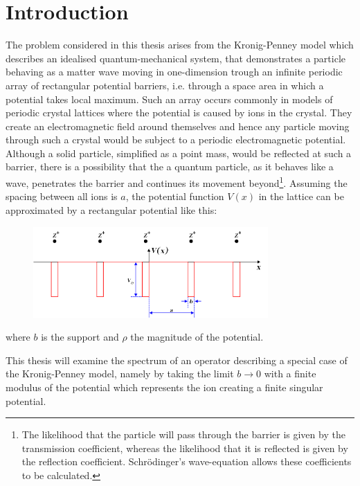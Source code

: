 \chapter{Introduction}

The problem considered in this thesis arises from the Kronig-Penney model which describes an idealised quantum-mechanical system, that demonstrates a particle behaving as a matter wave moving in one-dimension trough an infinite periodic array of rectangular potential barriers, i.e. through a space area in which a potential takes local maximum. Such an array occurs commonly in models of periodic crystal lattices where the potential is caused by ions in the crystal. They create an electromagnetic field around themselves and hence any particle moving through such a crystal would be subject to a periodic electromagnetic potential. Although a solid particle, simplified as a point mass, would be reflected at such a barrier, there is a possibility that the a quantum particle, as it behaves like a wave, penetrates the barrier and continues its movement beyond\footnote{The likelihood that the particle will pass through the barrier is given by the transmission coefficient, whereas the likelihood that it is reflected is given by the reflection coefficient. Schrödinger's wave-equation allows these coefficients to be calculated.}. Assuming the spacing between all ions is $a$, the potential function $V(x)$ in the lattice can be approximated by a rectangular potential like this:

\begin{figure}[h!] \centering
	  \includegraphics[width=0.8\textwidth]{Periodic_square_potential_130707} %
\end{figure}

where $b$ is the support and $\rho$ the magnitude of the potential.

This thesis will examine the spectrum of an operator describing a special case of the Kronig-Penney model, namely by taking the limit $b \rightarrow 0$ with a finite modulus of the potential which represents the ion creating a finite singular potential. 

